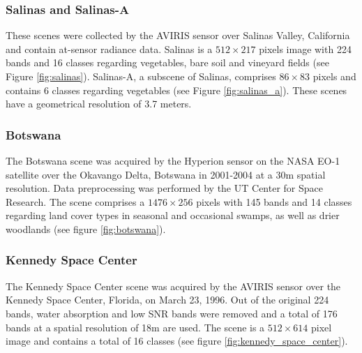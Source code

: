 \documentclass[parskip=full]{scrartcl}
\begin{document}
\subsubsection*{Salinas and Salinas-A}
These scenes were collected by the AVIRIS sensor over Salinas Valley,
California and contain at-sensor radiance data. Salinas is a
$512 \times 217$ pixels image with 224 bands and 16 classes regarding
vegetables, bare soil and vineyard fields (see Figure \ref{fig:salinas}).
Salinas-A, a subscene of Salinas, comprises $86 \times 83$ pixels and
contains 6 classes regarding vegetables (see Figure \ref{fig:salinas_a}).
These scenes have a geometrical resolution of 3.7 meters.

\subsubsection*{Botswana}
The Botswana scene was acquired by the Hyperion sensor on the NASA EO-1
satellite over the Okavango Delta, Botswana in 2001-2004 at a 30m spatial
resolution. Data preprocessing was performed by the UT Center for Space
Research. The scene comprises a $1476 \times 256$ pixels with 145 bands
and 14 classes regarding land cover types in seasonal and occasional swamps, as
well as drier woodlands (see figure \ref{fig:botswana}).

\subsubsection*{Kennedy Space Center}
The Kennedy Space Center scene was acquired by the AVIRIS sensor over the
Kennedy Space Center, Florida, on March 23, 1996. Out of the original 224
bands, water absorption and low SNR bands were removed and a total of 176 bands
at a spatial resolution of 18m are used. The scene is a $512 \times 614$
pixel image and contains a total of 16 classes (see figure
\ref{fig:kennedy_space_center}).
\end{document}
